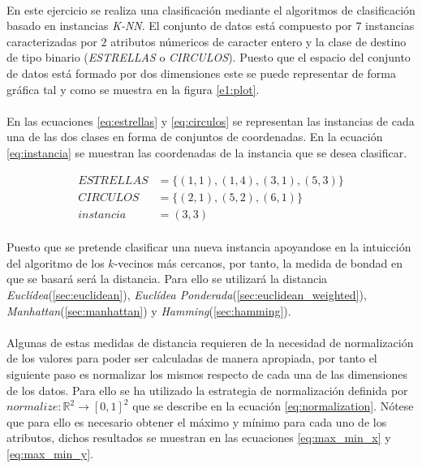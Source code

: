 \documentclass{article}
\begin{document}
		\paragraph{}
		En este ejercicio se realiza una clasificación mediante el algoritmos de clasificación basado en instancias \emph{K-NN}. El conjunto de datos está compuesto por $7$ instancias caracterizadas por $2$ atributos númericos de caracter entero y la clase de destino de tipo binario (\emph{ESTRELLAS} o \emph{CIRCULOS}). Puesto que el espacio del conjunto de datos está formado por dos dimensiones este se puede representar de forma gráfica tal y como se muestra en la figura \ref{e1:plot}.

		\paragraph{}
		En las ecuaciones \eqref{eq:estrellas} y \eqref{eq:circulos} se representan las instancias de cada una de las dos clases en forma de conjuntos de coordenadas. En la ecuación \eqref{eq:instancia} se muestran las coordenadas de la instancia que se desea clasificar.

		\begin{align}
		\label{eq:estrellas}
			ESTRELLAS &= \{(1,1), (1,4), (3,1), (5,3)\} \\
		\label{eq:circulos}
			CIRCULOS &= \{(2,1), (5,2), (6,1)\} \\
		\label{eq:instancia}
			instancia &= (3,3)
		\end{align}

		\paragraph{}
		Puesto que se pretende clasificar una nueva instancia apoyandose en la intuicción del algoritmo de los $k$-vecinos más cercanos, por tanto, la medida de bondad en que se basará será la distancia. Para ello se utilizará la distancia \emph{Euclídea}(\ref{sec:euclidean}), \emph{Euclídea Ponderada}(\ref{sec:euclidean_weighted}), \emph{Manhattan}(\ref{sec:manhattan}) y \emph{Hamming}(\ref{sec:hamming}).


		\paragraph{}
		Algunas de estas medidas de distancia requieren de la necesidad de normalización de los valores para poder ser calculadas de manera apropiada, por tanto el siguiente paso es normalizar los mismos respecto de cada una de las dimensiones de los datos. Para ello se ha utilizado la estrategia de normalización definida por $normalize \colon \mathbb{R}^2 \to [0,1]^2$ que se describe en la ecuación \eqref{eq:normalization}. Nótese que para ello es necesario obtener el máximo y mínimo para cada uno de los atributos, dichos resultados se muestran en las ecuaciones \eqref{eq:max_min_x} y \eqref{eq:max_min_y}.
\end{document}
